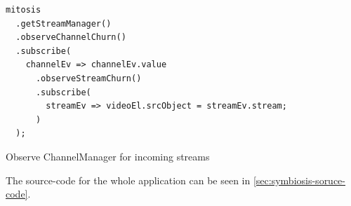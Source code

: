 \begin{Listing}
\begin{lstlisting}
mitosis
  .getStreamManager()
  .observeChannelChurn()
  .subscribe(
    channelEv => channelEv.value
      .observeStreamChurn()
      .subscribe(
        streamEv => videoEl.srcObject = streamEv.stream;
      )
  );
\end{lstlisting}
\caption{Observe ChannelManager for incoming streams}
\label{lst:symbiosis-observe-stream}
\end{Listing}

The source-code for the whole application can be seen in \vref{sec:symbiosis-soruce-code}.
